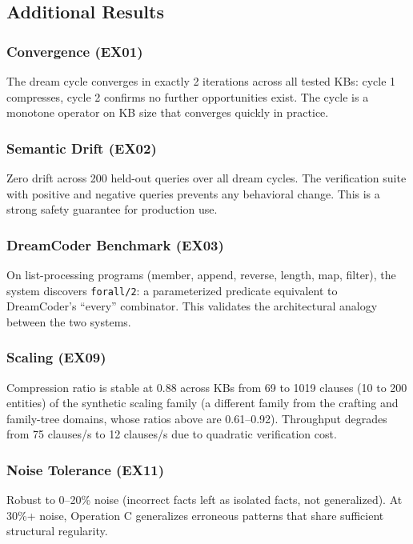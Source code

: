 \documentclass[10pt,conference]{IEEEtran}
\begin{document}
\subsection{Additional Results}

\subsubsection{Convergence (EX01)} The dream cycle converges in exactly 2 iterations across all tested KBs: cycle 1 compresses, cycle 2 confirms no further opportunities exist. The cycle is a monotone operator on KB size that converges quickly in practice.

\subsubsection{Semantic Drift (EX02)} Zero drift across 200 held-out queries over all dream cycles. The verification suite with positive and negative queries prevents any behavioral change. This is a strong safety guarantee for production use.

\subsubsection{DreamCoder Benchmark (EX03)} On list-processing programs (member, append, reverse, length, map, filter), the system discovers \texttt{forall/2}: a parameterized predicate equivalent to DreamCoder's ``every'' combinator. This validates the architectural analogy between the two systems.

\subsubsection{Scaling (EX09)} Compression ratio is stable at 0.88 across KBs from 69 to 1019 clauses (10 to 200 entities) of the synthetic scaling family (a different family from the crafting and family-tree domains, whose ratios above are 0.61--0.92). Throughput degrades from 75 clauses/s to 12 clauses/s due to quadratic verification cost.

\subsubsection{Noise Tolerance (EX11)} Robust to 0--20\% noise (incorrect facts left as isolated facts, not generalized). At 30\%+ noise, Operation C generalizes erroneous patterns that share sufficient structural regularity.
\end{document}
